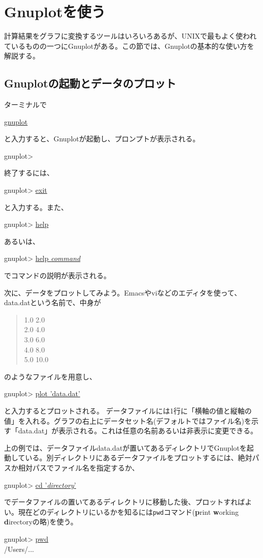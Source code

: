 \section{Gnuplotを使う}
\label{sec:unix:gnuplot}

計算結果をグラフに変換するツールはいろいろあるが、UNIXで最もよく使われているものの一つにGnuplotがある。この節では、Gnuplotの基本的な使い方を解説する。

\subsection{Gnuplotの起動とデータのプロット}

ターミナルで
\begin{commandline2}
\prompt \underline{gnuplot}
\end{commandline2} \noindent
と入力すると、Gnuplotが起動し、プロンプトが表示される。
\begin{commandline2}
gnuplot>
\end{commandline2} \noindent
終了するには、
\begin{commandline2}
gnuplot> \underline{exit}
\end{commandline2} \noindent
と入力する。また、
\begin{commandline2}
gnuplot> \underline{help}
\end{commandline2} \noindent
あるいは、
\begin{commandline2}
gnuplot> \underline{help {\it command}}
\end{commandline2} \noindent
でコマンドの説明が表示される。

次に、データをプロットしてみよう。Emacsやviなどのエディタを使って、data.datという名前で、中身が
\begin{quote}
 1.0 2.0 \\
 2.0 4.0 \\
 3.0 6.0 \\
 4.0 8.0 \\
 5.0 10.0
\end{quote}
のようなファイルを用意し、
\begin{commandline2}
gnuplot> \underline{plot 'data.dat'}
\end{commandline2} \noindent
と入力するとプロットされる。 データファイルには1行に「横軸の値と縦軸の値」を入れる。グラフの右上にデータセット名(デフォルトではファイル名)を示す「data.dat」が表示される。これは任意の名前あるいは非表示に変更できる。

上の例では、データファイルdata.datが置いてあるディレクトリでGnuplotを起動している。別ディレクトリにあるデータファイルをプロットするには、絶対パスか相対パスでファイル名を指定するか、
\begin{commandline2}
gnuplot> \underline{cd '{\it directory}'}
\end{commandline2} \noindent
でデータファイルの置いてあるディレクトリに移動した後、プロットすればよい。現在どのディレクトリにいるかを知るには{\tt pwd}コマンド({\bf p}rint {\bf w}orking {\bf d}irectoryの略)を使う。
\begin{commandline2}
gnuplot> \underline{pwd}\\
/Users/...  
\end{commandline2} \noindent

